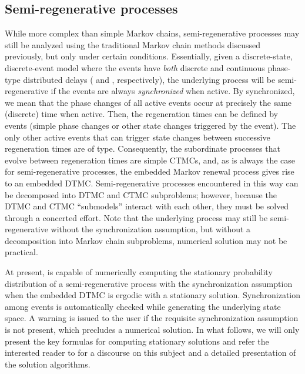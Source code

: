 \begin{developer}
\section{Semi-regenerative processes}\label{SEC:semi-regen-processes}
While more complex than simple Markov chains,
semi-regenerative processes may still be analyzed using
the traditional Markov chain methods discussed previously, but only under certain conditions.
Essentially, given a discrete-state, discrete-event model where the events have \emph{both}
discrete and continuous phase-type distributed delays
( and , respectively),
the underlying process will be semi-regenerative
if the  events are always \emph{synchronized} when active.
By synchronized,
we mean that the phase changes of all active  events occur at precisely the
same (discrete) time when active.
Then, the regeneration times can be defined by  events
(simple phase changes or other state changes triggered by the event).
The only other active events that can trigger state changes between successive regeneration times
are of  type.  Consequently, the subordinate processes that evolve between
regeneration times are simple CTMCs, and, as is always the case for semi-regenerative processes,
the embedded Markov renewal process gives rise to an embedded DTMC.
Semi-regenerative processes encountered in this way can be decomposed into
DTMC and CTMC subproblems; however, because the DTMC and CTMC ``submodels'' interact
with each other, they must be solved through a concerted effort.
Note that the underlying process may still be semi-regenerative without the synchronization
assumption, but without a decomposition into Markov chain subproblems, numerical solution
may not be practical.

At present, {\smart} is capable of numerically computing the stationary probability distribution
of a semi-regenerative process with the synchronization assumption when
the embedded DTMC is ergodic with a stationary solution.
Synchronization among  events is automatically checked while generating the
underlying state space.  A warning is issued to the user if the requisite synchronization
assumption is not present, which precludes a numerical solution.
In what follows, we will only present the key formulas for computing stationary solutions
and refer the interested reader to \cite{Jones-NASA-00}
for a discourse on this subject and a detailed presentation of the solution algorithms.


\end{developer}
